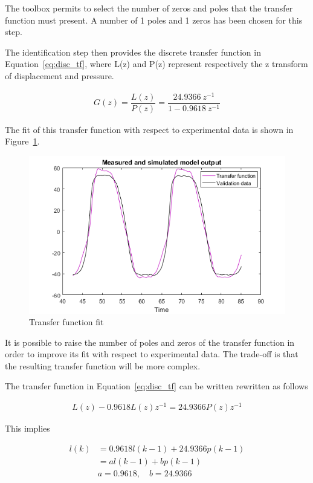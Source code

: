 The toolbox permits to select the number of zeros and poles that the transfer function
must present. A number of 1 poles and 1 zeros has been chosen for this step.

The identification step then provides the discrete transfer function
in Equation~\ref{eq:disc_tf}, where L(z) and P(z) represent respectively the z transform
of displacement and pressure.

\begin{align}
G(z) = \dfrac{L(z)}{P(z)} = \dfrac{24.9366\ z^{-1}}{1-0.9618\ z^{-1}}
\label{eq:disc_tf}
\end{align}


The fit of this transfer function with respect to experimental data is shown
in Figure~\ref{fig:fit}.

\begin{figure}[H]
	\centering
	\includegraphics[width=\linewidth]{"Images/fit"}
	\caption[Transfer function fit]{Transfer function fit}
	\label{fig:fit}
\end{figure}

It is possible to raise the number of poles and zeros of the transfer function
in order to improve its fit with respect to experimental data. 
The trade-off is that the resulting transfer function will be more complex.

The transfer function in Equation~\ref{eq:disc_tf} can be written rewritten as follows

\begin{align}
L(z) - 0.9618 L(z)z^{-1}  = 24.9366 P(z) z^{-1}
\label{eq:l_k_1}
\end{align}

This implies

\begin{align}
l(k) &= 0.9618 l(k-1) + 24.9366p(k-1) \nonumber \\
&= a l(k-1) + b p(k-1) \label{eq:l_k_2}\\
&a = 0.9618, \quad b = 24.9366 \nonumber
\end{align}

